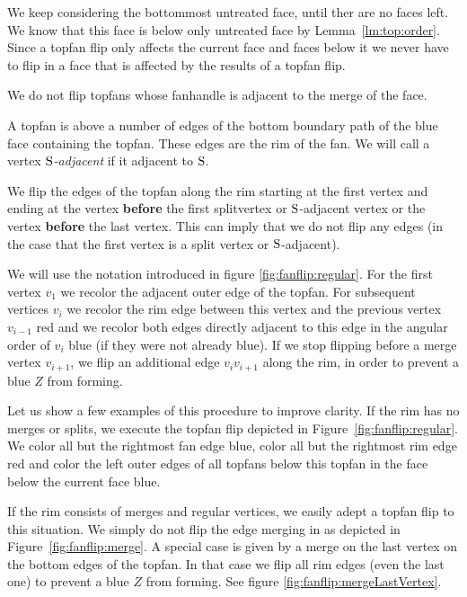   We keep considering the bottommost untreated face, until ther are no faces left. We know that this face is below only untreated face by Lemma~\ref{lm:top:order}. Since a topfan flip only affects the current face and faces below it we never have to flip in a face that is affected by the results of a topfan flip.

  We do not flip topfans whose fanhandle is adjacent to the merge of the face.

  A topfan is above a number of edges of the bottom boundary path of the blue face containing the topfan. These edges are the rim of the fan. We will call a vertex \emph{$\mathrm{S}$-adjacent} if it adjacent to $\mathrm{S}$.

  We flip the edges of the topfan along the rim starting at the first vertex and ending at the vertex \textbf{before} the first splitvertex or $\mathrm{S}$-adjacent vertex or the vertex \textbf{before} the last vertex. This can imply that we do not flip any edges (in the case that the first vertex is a split vertex or $\mathrm{S}$-adjacent).

  We will use the notation introduced in figure \ref{fig:fanflip:regular}.
  For the first vertex $v_1$ we recolor the adjacent outer edge of the topfan. For subsequent vertices $v_i$ we recolor the rim edge between this vertex and the previous vertex $v_{i-1}$ red and we recolor both edges directly adjacent to this edge in the angular order of $v_i$ blue (if they were not already blue).
  If we stop flipping before a merge vertex $v_{i+1}$, we flip an additional edge $v_i v_{i+1}$ along the rim, in order to prevent a blue $Z$ from forming.

  Let us show a few examples of this procedure to improve clarity.
  If the rim has no merges or splits, we execute the topfan flip depicted in Figure~\ref{fig:fanflip:regular}.
  We color all but the rightmost fan edge blue, color all but the rightmost rim edge red and color the left outer edges of all topfans below this topfan in the face below the current face blue.

  If the rim consists of merges and regular vertices, we easily adept a topfan flip to this situation. We simply do not flip the edge merging in as depicted in Figure~\ref{fig:fanflip:merge}.
  A special case is given by a merge on the last vertex on the bottom edges of the topfan. In that case we flip all rim edges (even the last one) to prevent a blue $Z$ from forming. See figure \ref{fig:fanflip:mergeLastVertex}.

